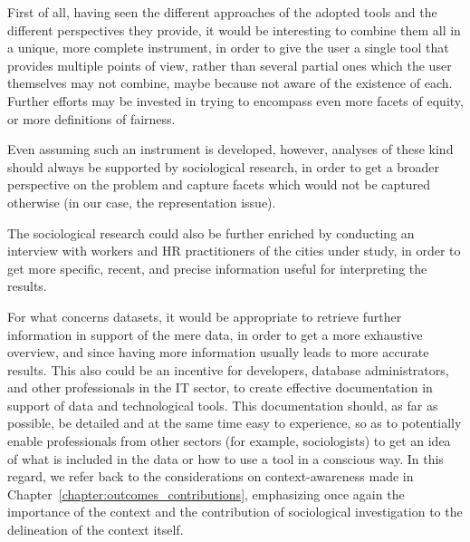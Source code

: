 First of all, having seen the different approaches of the adopted tools and the different perspectives they provide, it would be interesting to combine them all in a unique, more complete instrument, in order to give the user a single tool that provides multiple points of view, rather than several partial ones which the user themselves may not combine, maybe because not aware of the existence of each. Further efforts may be invested in trying to encompass even more facets of equity, or more definitions of fairness.

Even assuming such an instrument is developed, however, analyses of these kind should always be supported by sociological research, in order to get a broader perspective on the problem and capture facets which would not be captured otherwise (in our case, the representation issue).

The sociological research could also be further enriched by conducting an interview with workers and HR practitioners of the cities under study, in order to get more specific, recent, and precise information useful for interpreting the results.

For what concerns datasets, it would be appropriate to retrieve further information in support of the mere data, in order to get a more exhaustive overview, and since having more information usually leads to more accurate results. This also could be an incentive for developers, database administrators, and other professionals in the IT sector, to create effective documentation in support of data and technological tools. This documentation should, as far as possible, be detailed and at the same time easy to experience, so as to potentially enable professionals from other sectors (for example, sociologists) to get an idea of what is included in the data or how to use a tool in a conscious way. In this regard, we refer back to the considerations on context-awareness made in Chapter~\ref{chapter:outcomes_contributions}, emphasizing once again the importance of the context and the contribution of sociological investigation to the delineation of the context itself.
